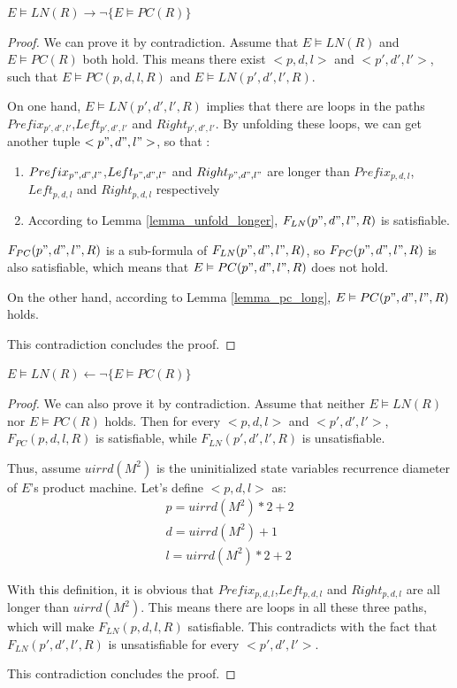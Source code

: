\documentclass{sig-alternate}
\begin{document}
\begin{theorem}[]\label{thm_pc_nln}
$E\vDash LN(R)\to \neg \{E\vDash PC(R)\}$
\end{theorem}
\begin{proof}
We can prove it by contradiction.
Assume that $E\vDash LN(R)$ and $E\vDash PC(R)$ both hold.
This means there exist $<p,d,l>$ and $<p',d',l'>$,
such that $E\vDash PC(p,d,l,R)$ and $E\vDash LN(p',d',l',R)$.

On one hand,
$E\vDash LN(p',d',l',R)$ implies that there are loops in the paths $Prefix_{p',d',l'}$,$Left_{p',d',l'}$ and $Right_{p',d',l'}$.
By unfolding these loops,
we can get another tuple $<p",d",l">$,
so that :
\begin{enumerate}
\item $Prefix_{p",d",l"}$,$Left_{p",d",l"}$ and $Right_{p",d",l"}$ are longer than $Prefix_{p,d,l}$,$Left_{p,d,l}$ and $Right_{p,d,l}$ respectively
\item According to Lemma \ref{lemma_unfold_longer},
$F_{LN}(p",d",l",R)$ is satisfiable.
\end{enumerate}

$F_{PC}(p",d",l",R)$ is a sub-formula of $F_{LN}(p",d",l",R)$,
so $F_{PC}(p",d",l",R)$ is also satisfiable,
which means that $E\vDash PC(p",d",l",R)$ does not hold.

On the other hand,
according to Lemma \ref{lemma_pc_long},
$E\vDash PC(p",d",l",R)$ holds.

This contradiction concludes the proof.
\end{proof}

\begin{theorem}[]\label{thm_nln_pc}
$E\vDash LN(R)\gets \neg \{E\vDash PC(R)\}$
\end{theorem}
\begin{proof}
We can also prove it by contradiction.
Assume that neither $E\vDash LN(R)$ nor $E\vDash PC(R)$ holds.
Then for every $<p,d,l>$ and $<p',d',l'>$,
$F_{PC}(p,d,l,R)$ is satisfiable,
while $F_{LN}(p',d',l',R)$ is unsatisfiable.

Thus,
assume $uirrd(M^2)$ is the uninitialized state variables recurrence diameter of $E$'s product machine.
Let's define $<p,d,l>$ as:
\begin{equation}
\begin{array}{c}
p=uirrd(M^2)*2+2 \\
d=uirrd(M^2)+1 \\
l=uirrd(M^2)*2+2
\end{array}
\end{equation}

With this definition,
it is obvious that $Prefix_{p,d,l}$,$Left_{p,d,l}$ and $Right_{p,d,l}$ are all longer than $uirrd(M^2)$.
This means there are loops in all these three paths,
which will make $F_{LN}(p,d,l,R)$ satisfiable.
This contradicts with the fact that $F_{LN}(p',d',l',R)$ is unsatisfiable for every $<p',d',l'>$.

This contradiction concludes the proof.
\end{proof}
\end{document}
